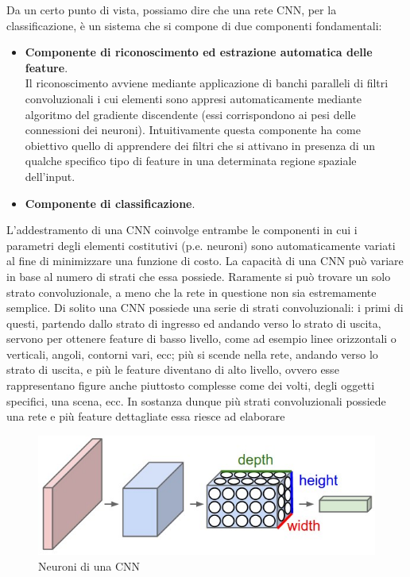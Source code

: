 \documentclass[twoside,twocolumn,10pt]{extarticle}
\theoremstyle{definition}
\begin{document}
Da un certo punto di vista, possiamo dire che una rete CNN, per la classificazione, è un sistema che si compone di due componenti fondamentali:
\begin{itemize}
	\item 
	\textbf{Componente di riconoscimento ed estrazione automatica delle feature}. \\Il riconoscimento avviene mediante applicazione di banchi paralleli di filtri convoluzionali i cui elementi sono appresi automaticamente mediante algoritmo del gradiente discendente (essi corrispondono ai pesi delle connessioni dei neuroni). Intuitivamente questa componente ha come obiettivo quello di apprendere dei filtri che si attivano in presenza di un qualche specifico tipo di feature in una determinata regione spaziale dell’input.
	\item
	\textbf{Componente di classificazione}.
\end{itemize}
L’addestramento di una CNN coinvolge entrambe le componenti in cui i parametri degli elementi costitutivi (p.e. neuroni) sono automaticamente variati al fine di minimizzare una funzione di costo.
La capacità di una CNN può variare in base al numero di strati che essa possiede. Raramente si può trovare un solo strato convoluzionale, a meno che la rete in questione non sia estremamente semplice. Di solito una CNN possiede una serie di strati convoluzionali: i primi di questi, partendo dallo strato di ingresso ed andando verso lo strato di uscita, servono per ottenere feature di basso livello, come ad esempio linee orizzontali o verticali, angoli, contorni vari, ecc; più si scende nella rete, andando verso lo strato di uscita, e più le feature diventano di alto livello, ovvero esse rappresentano figure anche piuttosto complesse come dei volti, degli oggetti specifici, una scena, ecc. In sostanza dunque più strati convoluzionali possiede una rete e più feature dettagliate essa riesce ad elaborare

\begin{figure}[h]
	\centering
	\includegraphics[scale=.5]{images/cnn.jpeg}
	\caption{Neuroni di una CNN}
	\label{fig:cnn}
\end{figure}
\end{document}
